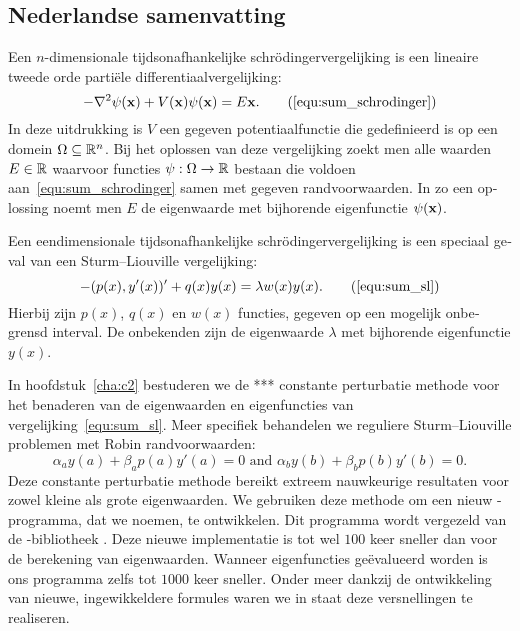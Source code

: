 \begin{otherlanguage}{dutch}
\section*{Nederlandse samenvatting}

Een $n$-dimensionale tijdsonafhankelijke schrödingervergelijking is een lineaire tweede orde partiële differentiaalvergelijking:
\begin{equation}
-\nabla^2 \psi(\vb{x}) + V(\vb{x}) \psi(\vb{x}) = E\vb{x}\text{.} \tag{\ref{equ:sum_schrodinger}}
\end{equation}
In deze uitdrukking is $V$ een gegeven potentiaalfunctie die gedefinieerd is op een domein $\Omega \subseteq \mathbb{R}^n$. Bij het oplossen van deze vergelijking zoekt men alle waarden $E\in \mathbb{R}$ waarvoor functies $\psi : \Omega \to \mathbb{R}$ bestaan die voldoen aan~\eqref{equ:sum_schrodinger} samen met gegeven randvoorwaarden. In zo een oplossing noemt men $E$ de eigenwaarde met bijhorende eigenfunctie $\psi(\vb{x})$.

Een eendimensionale tijdsonafhankelijke schrödingervergelijking is een speciaal geval van een Sturm--Liouville vergelijking:
\begin{equation}
    -(p(x), y'(x))' + q(x) y(x) = \lambda w(x) y(x) \text{.} \tag{\ref{equ:sum_sl}}
\end{equation}
Hierbij zijn $p(x)$, $q(x)$ en $w(x)$ functies, gegeven op een mogelijk onbegrensd interval. De onbekenden zijn de eigenwaarde $\lambda$ met bijhorende eigenfunctie $y(x)$.

In hoofdstuk~\ref{cha:c2} bestuderen we de *** constante perturbatie methode voor het benaderen van de eigenwaarden en eigenfuncties van vergelijking~\eqref{equ:sum_sl}. Meer specifiek behandelen we reguliere Sturm--Liouville problemen met Robin randvoorwaarden:
$$
\alpha_a y(a) + \beta_a p(a) y'(a) = 0 \text{ and } \alpha_b y(b) + \beta_b p(b) y'(b) = 0\text{.}
$$
Deze constante perturbatie methode bereikt extreem nauwkeurige resultaten voor zowel kleine als grote eigenwaarden. We gebruiken deze methode om een nieuw \cpp{}-programma, dat we  noemen, te ontwikkelen. Dit programma wordt vergezeld van de \lpython{}-bibliotheek \pyslise{}. Deze nieuwe implementatie is tot wel $100$ keer sneller dan  voor de berekening van eigenwaarden. Wanneer eigenfuncties geëvalueerd worden is ons programma zelfs tot $1000$ keer sneller. Onder meer dankzij de ontwikkeling van nieuwe, ingewikkeldere formules waren we in staat deze versnellingen te realiseren. 


\end{otherlanguage}
